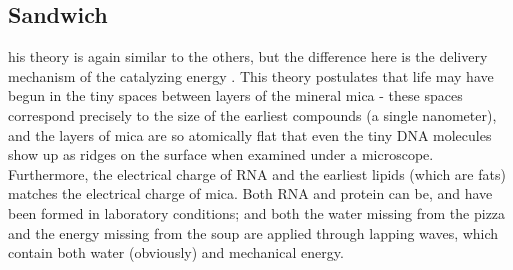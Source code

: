 \subsection*{Sandwich}
his theory is again similar to the others, but the difference here is the delivery mechanism of the catalyzing energy \cite{szosa}. This theory postulates that life may have begun in the tiny spaces between layers of the mineral mica - these spaces correspond precisely to the size of the earliest compounds (a single nanometer), and the layers of mica are so atomically flat that even the tiny DNA molecules show up as ridges on the surface when examined under a microscope. Furthermore, the electrical charge of RNA and the earliest lipids (which are fats) matches the electrical charge of mica. Both RNA and protein can be, and have been formed in laboratory conditions; and both the water missing from the pizza and the energy missing from the soup are applied through lapping waves, which contain both water (obviously) and mechanical energy. 